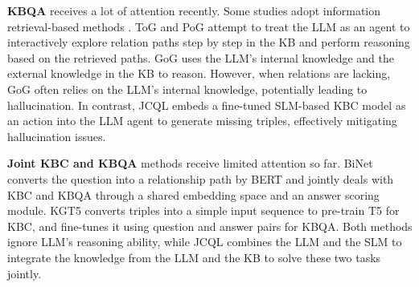 \documentclass[11pt]{article}
\begin{document}
\textbf{KBQA} receives a lot of attention recently. Some studies adopt information retrieval-based methods \cite{li2024cok, DBLP:conf/ijcai/Zhao0W0024}. ToG \cite{sun2023thinkongraph} and PoG \cite{Plan-on-Graph} attempt to treat the LLM as an agent to interactively explore relation paths step by step in the KB and perform reasoning based on the retrieved paths. GoG \cite{xu-etal-2024-generate} uses the LLM's internal knowledge and the external knowledge in the KB to reason. However, when relations are lacking, GoG often relies on the LLM's internal knowledge, potentially leading to hallucination. In contrast, JCQL embeds a fine-tuned SLM-based KBC model as an action into the LLM agent to generate missing triples, effectively mitigating hallucination issues.



\textbf{Joint KBC and KBQA} methods receive limited attention so far. BiNet \cite{lihui2022binet} converts the question into a relationship path by BERT and jointly deals with KBC and KBQA through a shared embedding space and an answer scoring module.
KGT5 \cite{saxena2022kgt5} converts triples into a simple input sequence to pre-train T5 for KBC, and fine-tunes it using question and answer pairs for KBQA. Both methods ignore LLM's reasoning ability, while JCQL combines the LLM and the SLM to integrate the knowledge from the LLM and the KB to solve these two tasks jointly.
\end{document}
